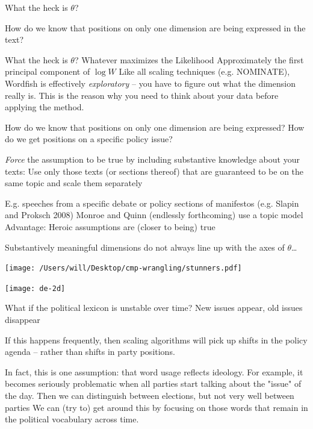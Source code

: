 \documentclass{mediumfoils}
\begin{document}

What the heck is $\theta$?

How do we know that positions on only one dimension are being expressed in the text?


What the heck is $\theta$?
\ita
\itm Whatever maximizes the Likelihood
\itm Approximately the first principal component of $\log W$ 
\itz
Like all scaling techniques (e.g. NOMINATE), Wordfish is effectively \textit{exploratory} -- you have to figure out what the dimension really is. This is the reason why you need to think about your data before applying the method.



How do we know that positions on only one dimension are being expressed? How do we get positions on a specific policy issue?

\textit {Force} the assumption to be true by including substantive knowledge about your texts:
\ita
\itm Use only those texts (or sections thereof)  that are guaranteed to be on the same topic and scale them separately 

\itm E.g. speeches from a specific debate or policy sections of manifestos (e.g.  Slapin and Proksch 2008)
\itm Monroe and Quinn (endlessly forthcoming) use a topic model
\itz
Advantage: Heroic assumptions are (closer to being) true



Substantively meaningful dimensions do not always line up with the axes of $\theta$\ldots

\centerline{\texttt{[image: /Users/will/Desktop/cmp-wrangling/stunners.pdf]}}


\centerline{\texttt{[image: de-2d]}}



What if the political lexicon is unstable over time?
\ita
\itm New issues appear, old issues disappear
\itz


If this happens frequently, then scaling algorithms will pick up shifts in the policy agenda -- rather than shifts in party positions. 

\ita
\itm In fact, this is one assumption: that word usage reflects ideology.
\itm For example, it becomes seriously problematic when all parties start talking about the "issue" of the day. Then we can distinguish between elections, but not very well between parties
\itm We can (try to) get around this by focusing on those words that remain in the political vocabulary across time.
\itz
\end{document}
